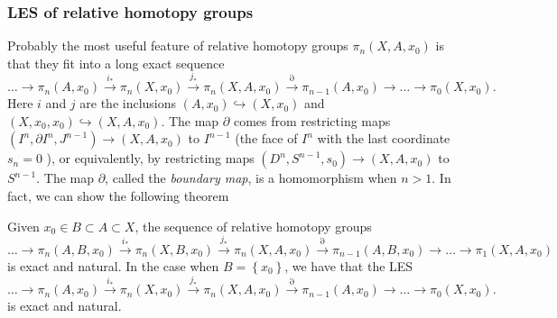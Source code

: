   \subsubsection{LES of relative homotopy groups}
  Probably the most useful feature of relative homotopy
  groups $\pi_n (X,A,x_0)$ is that they 
  fit into a long exact sequence
  \[
  \ldots \to \pi_n (A,x_0)
  \stackrel{i_*}{\to} \pi_n(X,x_0)
  \stackrel{j_*}{\to} \pi_n (X,A,x_0)
  \stackrel{\partial}{\to} \pi_{n-1}(A,x_0) \to 
  \ldots \to \pi_0 (X,x_0).
  \] 
  Here $i$ and $j$ are the inclusions
  $\left( A, x_0 \right) \hookrightarrow
  (X,x_0)$ and
  $\left( X, x_0, x_0 \right) \hookrightarrow
  \left( X,A,x_0 \right) $. The map
  $\partial$ comes from restricting maps
  $\left( I^{n},\partial I^{n}, J^{n-1} \right) \to 
  \left( X,A,x_0 \right) $ to
  $I^{n-1}$ (the face of $I^{n}$ with the last
  coordinate $s_n = 0$ ),
  or equivalently, by restricting maps
  $\left( D^{n},S^{n-1},s_0 \right) \to 
  \left( X,A,x_0 \right) $ to $S^{n-1}$. The map $\partial$,
  called the \textit{boundary map}, is a homomorphism
  when $n>1$. In fact, we can show the following theorem

  \begin{theorem}
      Given 
      $x_0 \in B \subset A \subset X$,
      the sequence of relative homotopy groups
  \[
      \ldots \to 
      \pi_n \left( A,B, x_0 \right) 
      \stackrel{i_*}{\to} 
      \pi_n \left( X, B, x_0 \right) 
      \stackrel{j_*}{\to} 
      \pi_n (X, A, x_0)
      \stackrel{\partial}{\to} 
      \pi_{n-1} \left( A,B, x_0 \right) 
      \to \ldots \to 
      \pi_1 (X,A,x_0)
  \] 
  is exact and natural.
  In the case when $B = \left\{ x_0 \right\} $, we have that
  the LES
  \[
  \ldots \to \pi_n (A,x_0)
  \stackrel{i_*}{\to} \pi_n(X,x_0)
  \stackrel{j_*}{\to} \pi_n (X,A,x_0)
  \stackrel{\partial}{\to} \pi_{n-1}(A,x_0) \to 
  \ldots \to \pi_0 (X,x_0).
  \] 
  is exact and natural.
  \end{theorem}

